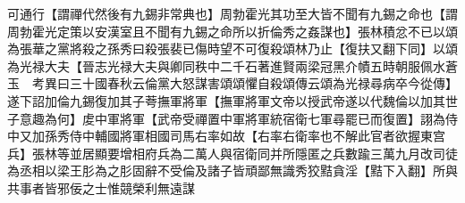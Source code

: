 可通行【謂禪代然後有九錫非常典也】周勃霍光其功至大皆不聞有九錫之命也【謂周勃霍光定策以安漢室且不聞有九錫之命所以折倫秀之姦謀也】張林積忿不已以頌為張華之黨將殺之孫秀曰殺張裴已傷時望不可復殺頌林乃止【復扶又翻下同】以頌為光禄大夫【晉志光禄大夫與卿同秩中二千石著進賢兩梁冠黑介幘五時朝服佩水蒼玉　考異曰三十國春秋云倫黨大怒謀害頌頌懼自殺頌傳云頌為光禄尋病卒今從傳】遂下詔加倫九錫復加其子荂撫軍將軍【撫軍將軍文帝以授武帝遂以代魏倫以加其世子意趣為何】䖍中軍將軍【武帝受禪置中軍將軍統宿衛七軍尋罷已而復置】詡為侍中又加孫秀侍中輔國將軍相國司馬右率如故【右率右衛率也不解此官者欲握東宫兵】張林等並居顯要增相府兵為二萬人與宿衛同并所隱匿之兵數踰三萬九月改司徒為丞相以梁王肜為之肜固辭不受倫及諸子皆頑鄙無識秀狡黠貪淫【黠下入翻】所與共事者皆邪佞之士惟競榮利無遠謀